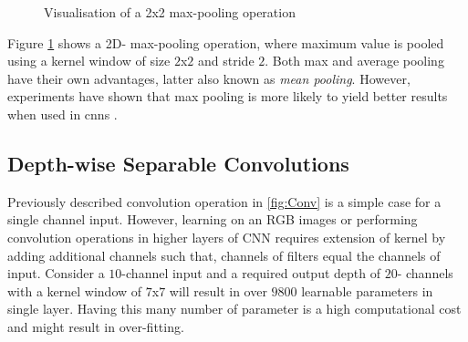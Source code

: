 \begin{figure}[!ht]
    	\caption[Max Pooling Operation]{Visualisation of a 2x2 max-pooling operation \cite{MAXPOOLING}}
	\label{fig: maxpooling} 
\end{figure}

Figure \ref{fig: maxpooling} shows a 2D- max-pooling operation, where maximum value is pooled using a kernel window of size $2$x$2$ and stride $2$. Both max and average pooling have their own advantages, latter also known as \textit{mean pooling}. However, experiments have shown that max pooling is more likely to yield better results when used in \gls{cnns} \cite{Scherer2010}. 




\subsection{Depth-wise Separable Convolutions}

Previously described convolution operation in \ref{fig:Conv} is a simple case for a single channel input. However, learning on an RGB images or performing convolution operations in higher layers of CNN requires extension of kernel by adding additional channels such that, channels of filters equal the channels of input. Consider a $10$-channel input and a required output depth of $20$- channels with a kernel window of $7$x$7$ will result in over $9800$ learnable parameters in single layer. Having this many number of parameter is a high computational cost and might result in over-fitting.

